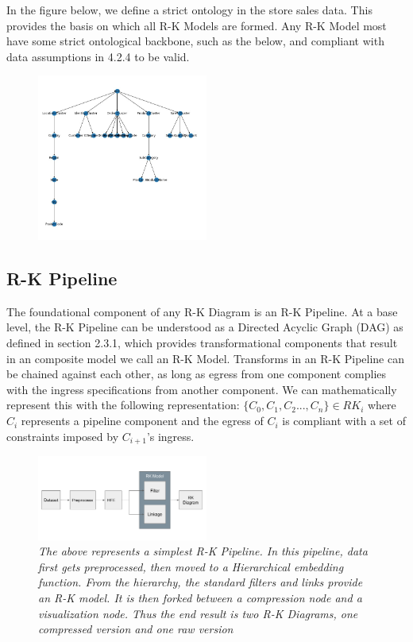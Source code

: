 In the figure below, we define a strict ontology in the store sales data. This provides the basis on which all R-K Models are formed. Any R-K Model most have some strict ontological backbone, such as the below, and compliant with data assumptions in 4.2.4 to be valid.

\begin{figure}
	\centering
        \includegraphics[width=0.5\textwidth]{images/ss_dendrogram.png}
	\caption{\textit{}}
	\label{fig:ss_dendrogram}
\end{figure}


\subsection{R-K Pipeline}
\label{subsec:R-K Pipeline}

The foundational component of any R-K Diagram is an R-K Pipeline. At a base level, the R-K Pipeline can be understood as a Directed Acyclic Graph (DAG) as defined in section 2.3.1, which provides transformational components that result in an composite model we call an R-K Model. Transforms in an R-K Pipeline can be chained against each other, as long as egress from one component complies with the ingress specifications from another component. We can mathematically represent this with the following representation: $\lbrace C_{0}, C_{1}, C_{2}..., C_{n} \rbrace \in RK_{i} $ where $C_{i}$ represents a pipeline component and the egress of $C_{i}$ is compliant with a set of constraints imposed by $C_{i+1}$'s ingress.
\begin{figure}
	\centering
        \includegraphics[width=0.5\textwidth]{images/simpliest_pipeline.png}
	\caption{\textit{The above represents a simplest R-K Pipeline. In this pipeline, data first gets preprocessed, then moved to a Hierarchical embedding function. From the hierarchy, the standard filters and links provide an R-K model. It is then forked between a compression node and a visualization node. Thus the end result is two R-K Diagrams, one compressed version and one raw version}}
	\label{fig:simpliest_pipeline}
\end{figure}

